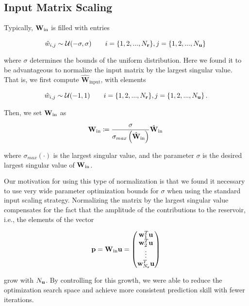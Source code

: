 \subsection{Input Matrix Scaling}
\label{subsec:input-scaling}

Typically, $\mathbf{W}_\text{in}$ is filled with entries
\begin{linenomath*}\begin{equation*}
    \hat{w}_{i,j} \sim \mathcal{U}(-\sigma,\sigma) \qquad
    i = \{1, 2, ..., N_{\mathbf{r}}\}, j=\{1,2, ..., N_{\mathbf{u}}\} \,
\end{equation*}\end{linenomath*}
where $\sigma$ determines the bounds of the uniform
distribution.
Here we found it to be advantageous to normalize the input matrix by the
largest singular value.
That is, we first compute $\hat{\mathbf{W}}_\text{input}$, with elements
\begin{linenomath*}\begin{equation*}
    \hat{w}_{i,j} \sim \mathcal{U}(-1,1) \qquad
    i = \{1, 2, ..., N_{\mathbf{r}}\}, j=\{1,2, ..., N_{\mathbf{u}}\} \, .
\end{equation*}\end{linenomath*}
Then, we set $\mathbf{W}_\text{in}$ as
\begin{linenomath*}\begin{equation*}
    \mathbf{W}_\text{in} \coloneqq
    \dfrac{\sigma}{\sigma_{max}\left(\hat{\mathbf{W}}_\text{in}\right)}
    \hat{\mathbf{W}}_\text{in} \,
\end{equation*}\end{linenomath*}
where $\sigma_{max}\left(\cdot\right)$ is the largest singular value, and
the parameter $\sigma$ is the desired largest singular value of
$\mathbf{W}_\text{in}$.

Our motivation for using this type of normalization is that we found it
necessary to use very wide parameter optimization bounds for $\sigma$ when
using the standard input scaling strategy.
Normalizing the matrix by the largest singular value compensates for the fact that
the amplitude of the contributions to the reservoir, i.e., the elements of the
vector
\begin{linenomath*}\begin{equation*}
    \mathbf{p} = \mathbf{W}_\text{in} \mathbf{u} =
    \begin{pmatrix}
        \mathbf{w}_1^T\mathbf{u} \\
        \mathbf{w}_2^T\mathbf{u} \\
        \vdots \\
        \mathbf{w}_{N_{\mathbf{r}}}^T\mathbf{u}
    \end{pmatrix}
\end{equation*}\end{linenomath*}
grow with $N_{\mathbf{u}}$.
By controlling for this growth, we were able to reduce the optimization search
space and achieve more consistent prediction skill with fewer iterations.


